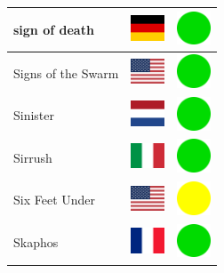 \documentclass[12pt, a4paper, twoside]{report}
\begin{document}
\begin{center}
\begin{longtable}{|p{5cm}|p{2cm}|p{2cm}|}
 sign of death                                              & \includegraphics[width=1cm]{../img/flags/de} &   \includegraphics[width=1cm]{../likes/y} \\ \hline
 Signs of the Swarm                                         & \includegraphics[width=1cm]{../img/flags/us} &   \includegraphics[width=1cm]{../likes/y} \\ \hline
 Sinister                                                   & \includegraphics[width=1cm]{../img/flags/nl} &   \includegraphics[width=1cm]{../likes/y} \\ \hline
 Sirrush                                                    & \includegraphics[width=1cm]{../img/flags/it} &   \includegraphics[width=1cm]{../likes/y} \\ \hline
 Six Feet Under                                             & \includegraphics[width=1cm]{../img/flags/us} &   \includegraphics[width=1cm]{../likes/m} \\ \hline
 Skaphos                                                    & \includegraphics[width=1cm]{../img/flags/fr} &   \includegraphics[width=1cm]{../likes/y} \\ \hline

\end{longtable}
\end{center}
\end{document}
